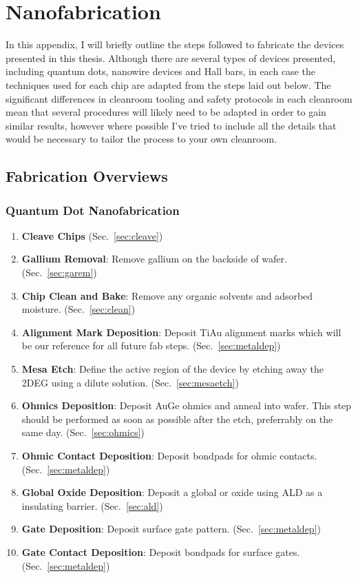 \chapter{Nanofabrication}
\label{sec:fab}
In this appendix, I will briefly outline the steps followed to fabricate the devices presented in this thesis.
Although there are several types of devices presented, including quantum dots, nanowire devices and Hall bars,
in each case the techniques used for each chip are adapted from the steps laid out below. The significant differences
in cleanroom tooling and safety protocols in each cleanroom mean that several procedures will likely need to
be adapted in order to gain similar results, however where possible I've tried to include all the details
that would be necessary to tailor the process to your own cleanroom.

\section{Fabrication Overviews}
\label{sec:fab_overview}

\subsection{Quantum Dot Nanofabrication}
\begin{enumerate}
    \item \textbf{Cleave Chips} (Sec.~\ref{sec:cleave})
    \item \textbf{Gallium Removal}: Remove gallium on the backside of wafer. (Sec.~\ref{sec:garem})
    \item \textbf{Chip Clean and Bake}: Remove any organic solvents and adsorbed moisture. (Sec.~\ref{sec:clean})
    \item \textbf{Alignment Mark Deposition}: Deposit TiAu alignment marks which will be our reference for all future fab steps. (Sec.~\ref{sec:metaldep})
    \item \textbf{Mesa Etch}: Define the active region of the device by etching away the 2DEG using a dilute  solution. (Sec.~\ref{sec:mesaetch})
    \item \textbf{Ohmics Deposition}: Deposit AuGe ohmics and anneal into wafer. This step should be performed as soon as possible after the etch, preferrably on the same day. (Sec.~\ref{sec:ohmics})
    \item \textbf{Ohmic Contact Deposition}: Deposit bondpads for ohmic contacts. (Sec.~\ref{sec:metaldep})
    \item \textbf{Global Oxide Deposition}: Deposit a global  or  oxide using ALD as a insulating barrier. (Sec.~\ref{sec:ald})
    \item \textbf{Gate Deposition}: Deposit surface gate pattern. (Sec.~\ref{sec:metaldep})
    \item \textbf{Gate Contact Deposition}: Deposit bondpads for surface gates. (Sec.~\ref{sec:metaldep})
\end{enumerate}

